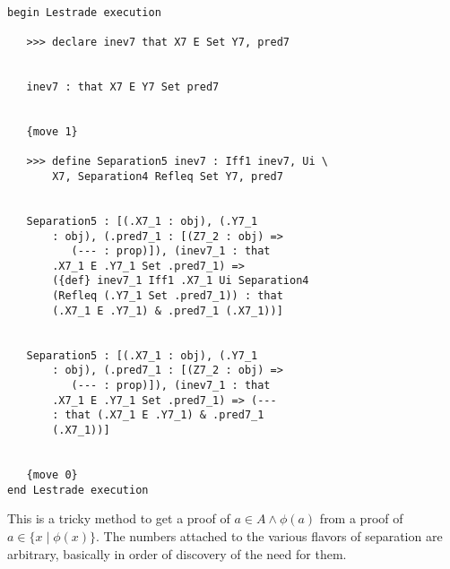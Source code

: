 \documentclass[12pt]{article}
\begin{document}
\begin{verbatim}

begin Lestrade execution

   >>> declare inev7 that X7 E Set Y7, pred7


   inev7 : that X7 E Y7 Set pred7


   {move 1}

   >>> define Separation5 inev7 : Iff1 inev7, Ui \
       X7, Separation4 Refleq Set Y7, pred7


   Separation5 : [(.X7_1 : obj), (.Y7_1 
       : obj), (.pred7_1 : [(Z7_2 : obj) => 
          (--- : prop)]), (inev7_1 : that 
       .X7_1 E .Y7_1 Set .pred7_1) => 
       ({def} inev7_1 Iff1 .X7_1 Ui Separation4 
       (Refleq (.Y7_1 Set .pred7_1)) : that 
       (.X7_1 E .Y7_1) & .pred7_1 (.X7_1))]


   Separation5 : [(.X7_1 : obj), (.Y7_1 
       : obj), (.pred7_1 : [(Z7_2 : obj) => 
          (--- : prop)]), (inev7_1 : that 
       .X7_1 E .Y7_1 Set .pred7_1) => (--- 
       : that (.X7_1 E .Y7_1) & .pred7_1 
       (.X7_1))]


   {move 0}
end Lestrade execution
\end{verbatim}

This is a tricky method to get a proof of $a \in A \wedge \phi(a)$ from a proof of $a \in \{x \mid \phi(x)\}$.  The numbers attached to the various flavors of separation are arbitrary, basically in order of discovery of the need for them.
\end{document}
